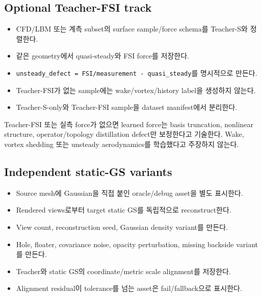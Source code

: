 \documentclass[10pt,a4paper]{article}
\newcommand{\todo}{\textcolor{TodoGray}{\(\square\)}}
\newcommand{\code}[1]{\texttt{#1}}
\begin{document}
\subsection*{Optional Teacher-FSI track}

\begin{itemize}
  \item[\todo] CFD/LBM 또는 계측 subset의 surface sample/force schema를 Teacher-S와 정렬한다.
  \item[\todo] 같은 geometry에서 quasi-steady와 FSI force를 저장한다.
  \item[\todo] \code{unsteady\_defect = FSI/measurement - quasi\_steady}를 명시적으로 만든다.
  \item[\todo] Teacher-FSI가 없는 sample에는 wake/vortex/history label을 생성하지 않는다.
  \item[\todo] Teacher-S-only와 Teacher-FSI sample을 dataset manifest에서 분리한다.
\end{itemize}

\begin{tcolorbox}[colback=LightOrange,colframe=orange!60!black,title=Claim 제한,fonttitle=\bfseries]
Teacher-FSI 또는 실측 force가 없으면 learned force는 basis truncation, nonlinear structure,
operator/topology distillation defect만 보정한다고 기술한다. Wake, vortex shedding 또는 unsteady aerodynamics를 학습했다고 주장하지 않는다.
\end{tcolorbox}

\subsection*{Independent static-GS variants}

\begin{itemize}
  \item[\todo] Source mesh에 Gaussian을 직접 붙인 oracle/debug asset을 별도 표시한다.
  \item[\todo] Rendered views로부터 target static GS를 독립적으로 reconstruct한다.
  \item[\todo] View count, reconstruction seed, Gaussian density variant를 만든다.
  \item[\todo] Hole, floater, covariance noise, opacity perturbation, missing backside variant를 만든다.
  \item[\todo] Teacher와 static GS의 coordinate/metric scale alignment를 저장한다.
  \item[\todo] Alignment residual이 tolerance를 넘는 asset은 fail/fallback으로 표시한다.
\end{itemize}
\end{document}
